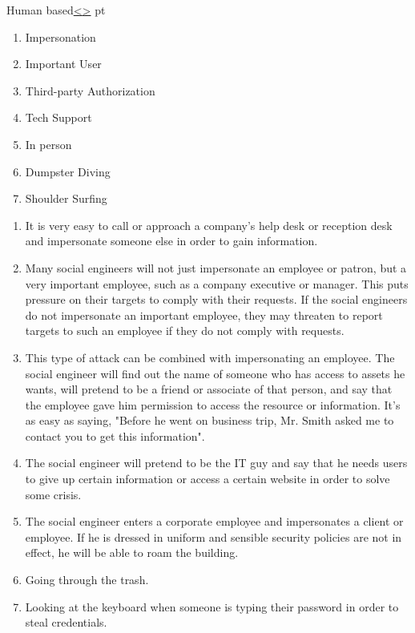 \documentclass[12pt]{extarticle}
\newenvironment{instructionblock}{\Large\bgroup}{\egroup}
\begin{document}
\pagebreak

\begin{slide}{Human based}{\hyperref[slide 7]{\textless}\hyperref[slide 9]{\textgreater}}
	 pt
	\begin{instructionblock}
		\begin{enumerate}
			\item Impersonation
			\item Important User
			\item Third-party Authorization
			\item Tech Support
			\item In person
			\item Dumpster Diving
			\item Shoulder Surfing
		\end{enumerate}
	\end{instructionblock}
\end{slide}
\begin{enumerate}
	\item It is very easy to call or approach a company's help desk or reception desk and impersonate someone else in order to gain information. \cite{b7}
	\item Many social engineers will not just impersonate an employee or patron, but a very important employee, such as a company executive or manager. This puts pressure on their targets to comply with their requests. If the social engineers do not impersonate an important employee, they may threaten to report targets to such an employee if they do not comply with requests.\cite{b7}
	\item This type of attack can be combined with impersonating an employee. The social engineer will find out the name of someone who has access to assets he wants, will pretend to be a friend or associate of that person, and say that the employee gave him permission to access the resource or information. It's as easy as saying, "Before he went on business trip, Mr. Smith asked me to contact you to get this information".\cite{b7}
	\item The social engineer will pretend to be the IT guy and say that he needs users to give up certain information or access a certain website in order to solve some crisis.\cite{b7}
	\item The social engineer enters a corporate employee and impersonates a client or employee. If he is dressed in uniform and sensible security policies are not in effect, he will be able to roam the building.\cite{b7}
	\item Going through the trash.\cite{b7}
	\item Looking at the keyboard when someone is typing their password in order to steal credentials.\cite{b7}
\end{enumerate}
\end{document}
